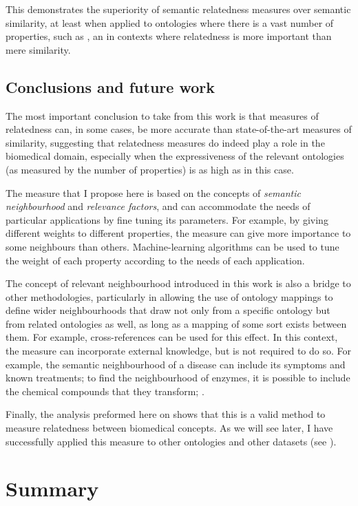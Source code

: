 This demonstrates the superiority of semantic relatedness measures over semantic similarity, at least when applied to ontologies where there is a vast number of properties, such as , an in contexts where relatedness is more important than mere similarity.


\subsection{Conclusions and future work}

The most important conclusion to take from this work is that measures of relatedness can, in some cases, be more accurate than state-of-the-art measures of similarity, suggesting that relatedness measures do indeed play a role in the biomedical domain, especially when the expressiveness of the relevant ontologies (as measured by the number of properties) is as high as in this case.

The measure that I propose here is based on the concepts of \emph{semantic neighbourhood} and \emph{relevance factors}, and can accommodate the needs of particular applications by fine tuning its parameters. For example, by giving different weights to different properties, the measure can give more importance to some neighbours than others. Machine-learning algorithms can be used to tune the weight of each property according to the needs of each application.

The concept of relevant neighbourhood introduced in this work is also a bridge to other methodologies, particularly in allowing the use of ontology mappings to define wider neighbourhoods that draw not only from a specific ontology but from related ontologies as well, as long as a mapping of some sort exists between them. For example, cross-references can be used for this effect. In this context, the measure can incorporate external knowledge, but is not required to do so. For example, the semantic neighbourhood of a disease can include its symptoms and known treatments; to find the neighbourhood of enzymes, it is possible to include the chemical compounds that they transform; \etc.

Finally, the analysis preformed here on  shows that this is a valid method to measure relatedness between biomedical concepts. As we will see later, I have successfully applied this measure to other ontologies and other datasets (see ).


\section{Summary} \label{sec:enhancements/summary}

